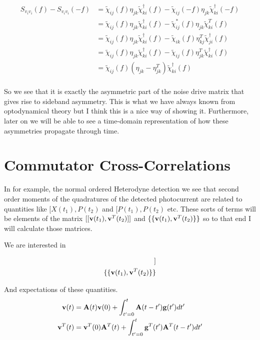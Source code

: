 \documentclass[12pt]{article}
\newcommand{\bv}[1]{\bold{#1}}
\begin{document}
\begin{align}
S_{v_i v_i}(f) - S_{v_i v_i}(-f) &= \tilde{\chi}_{ij}(f) \eta_{jk} \tilde{\chi}^{\dag}_{ki}(f) - \tilde{\chi}_{ij}(-f) \eta_{jk} \tilde{\chi}^{\dag}_{ki}(-f)\\
&= \tilde{\chi}_{ij}(f) \eta_{jk} \tilde{\chi}^{\dag}_{ki}(f) - \tilde{\chi}^*_{ij}(f) \eta_{jk} \tilde{\chi}^{T}_{ki}(f)\\
&= \tilde{\chi}_{ij}(f) \eta_{jk} \tilde{\chi}^{\dag}_{ki}(f) - \tilde{\chi}_{ik}(f) \eta^T_{kj} \tilde{\chi}^{\dag}_{ji}(f)\\
&= \tilde{\chi}_{ij}(f) \eta_{jk} \tilde{\chi}^{\dag}_{ki}(f) - \tilde{\chi}_{ij}(f) \eta^T_{jk} \tilde{\chi}^{\dag}_{ki}(f)\\
&= \tilde{\chi}_{ij}(f) (\eta_{jk}-\eta^T_{jk}) \tilde{\chi}^{\dag}_{ki}(f)\\
\end{align}

So we see that it is exactly the asymmetric part of the noise drive matrix that gives rise to sideband asymmetry. This is what we have always known from optodynamical theory but I think this is  a nice way of showing it. Furthermore, later on we will be able to see a time-domain representation of how these asymmetries propagate through time.

\section{Commutator Cross-Correlations}
In for example, the normal ordered Heterodyne detection we see that second order moments of the quadratures of the detected photocurrent are related to quantities like $[X(t_1),P(t_2)$ and $[P(t_1),P(t_2)$ etc. These sorts of terms will be elements of the matrix $[[\bv{v}(t_1),\bv{v}^T(t_2)]]$ and $\{\{\bv{v}(t_1),\bv{v}^T(t_2)\}\}$ so to that end I will calculate those matrices.

We are interested in

\begin{align}
[[\bv{v}(t_1),\bv{v}^T(t_2)]]\\
\{\{\bv{v}(t_1),\bv{v}^T(t_2)\}\}
\end{align}

And expectations of these quantities. 
\begin{align}
\bv{v}(t) &= \bv{A}(t) \bv{v}(0) + \int_{t'=0}^t \bv{A}(t-t') \bv{g}(t') dt'\\
\bv{v}^T(t) &=  \bv{v}^T(0)\bv{A}^T(t) + \int_{t'=0}^t \bv{g}^T(t')\bv{A}^T(t-t')  dt'
\end{align}
\end{document}
